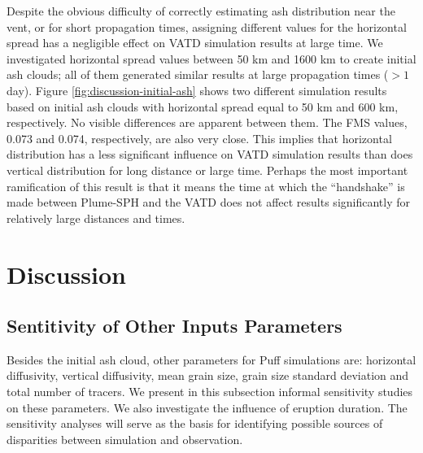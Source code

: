 \documentclass[utf8]{frontiersSCNS} %
\begin{document}
Despite the obvious difficulty of correctly estimating ash distribution near the vent, or for short propagation times, assigning different values for the horizontal spread has a negligible effect on VATD simulation results at large time. We investigated horizontal spread values between 50 km and 1600 km to create initial ash clouds; all of them generated similar results at large propagation times ($> 1$ day). Figure \ref{fig:discussion-initial-ash} shows two different simulation results based on initial ash clouds with horizontal spread equal to 50 km and 600 km, respectively. No visible differences are apparent between them. The FMS values, 0.073 and 0.074, respectively,  are also very close. This implies that horizontal distribution has a less significant influence on VATD simulation results than does vertical distribution for long distance or large time.  Perhaps the most important ramification of this result is that it means the time at which the ``handshake'' is made between Plume-SPH and the VATD does not affect results significantly for relatively large distances and times.

\section{Discussion}
\subsection{Sentitivity of Other Inputs Parameters}
Besides the initial ash cloud, other parameters for Puff simulations are: horizontal diffusivity, vertical diffusivity, mean grain size, grain size standard deviation and total number of tracers. We present in this subsection informal sensitivity studies on these parameters. We also investigate the influence of eruption duration. The sensitivity analyses will serve as the basis for identifying possible sources of disparities between simulation and observation.
\end{document}
